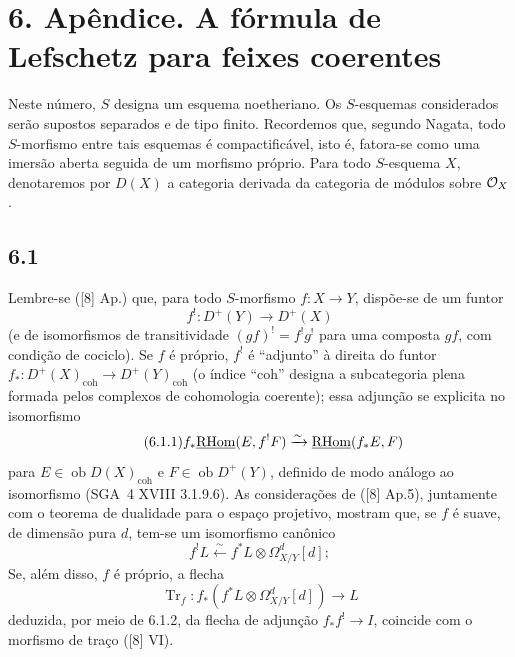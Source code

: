 \section*{6. Apêndice. A fórmula de Lefschetz para feixes coerentes}

Neste número, $S$ designa um esquema noetheriano. Os $S$-esquemas considerados serão supostos separados e de tipo finito. Recordemos que, segundo Nagata, todo $S$-morfismo entre tais esquemas é compactificável, isto é, fatora-se como uma imersão aberta seguida de um morfismo próprio. Para todo $S$-esquema $X$, denotaremos por $D(X)$ a categoria derivada da categoria de módulos sobre $\mathcal{O}_X$.

\subsection*{6.1}
Lembre-se ([8] Ap.) que, para todo $S$-morfismo $f:X\to Y$, dispõe-se de um funtor
\[
f^!:D^+(Y)\longrightarrow D^+(X)
\]
(e de isomorfismos de transitividade $(gf)^! = f^!g^!$ para uma composta $gf$, com condição de cociclo). Se $f$ é próprio, $f^!$ é ``adjunto'' à direita do funtor $f_*:D^+(X)_{\mathrm{coh}}\to D^+(Y)_{\mathrm{coh}}$ (o índice ``coh'' designa a subcategoria plena formada pelos complexos de cohomologia coerente); essa adjunção se explicita no isomorfismo
\begin{equation}
\tag{6.1.1}
f_*\underline{\mathrm{RHom}}(E,f^!F)\xrightarrow{\sim}\underline{\mathrm{RHom}}(f_*E,F)
\end{equation}
para $E\in\operatorname{ob}D(X)_{\mathrm{coh}}$ e $F\in\operatorname{ob}D^+(Y)$, definido de modo análogo ao isomorfismo (SGA~4 XVIII 3.1.9.6). As considerações de ([8] Ap.5), juntamente com o teorema de dualidade para o espaço projetivo, mostram que, se $f$ é suave, de dimensão pura $d$, tem-se um isomorfismo canônico
\begin{equation}
\tag{6.1.2}
f^!L\xleftarrow{\sim} f^*L\otimes\Omega^d_{X/Y}[d];
\end{equation}
Se, além disso, $f$ é próprio, a flecha
\begin{equation}
\tag{6.1.3}
\operatorname{Tr}_f:f_*(f^*L\otimes\Omega^d_{X/Y}[d])\longrightarrow L
\end{equation}
deduzida, por meio de 6.1.2, da flecha de adjunção $f_*f^!\to I$, coincide com o morfismo de traço ([8] VI).

